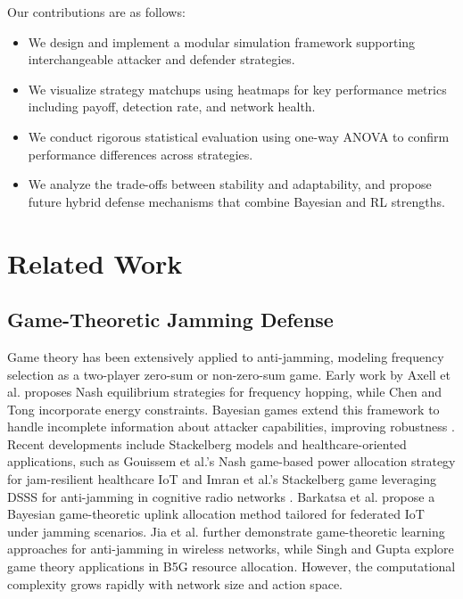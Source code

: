\documentclass[conference]{IEEEtran}
\begin{document}
Our contributions are as follows:
\begin{itemize}
  \item We design and implement a modular simulation framework supporting interchangeable attacker and defender strategies.  
  \item We visualize strategy matchups using heatmaps for key performance metrics including payoff, detection rate, and network health.  
  \item We conduct rigorous statistical evaluation using one-way ANOVA to confirm performance differences across strategies.  
  \item We analyze the trade-offs between stability and adaptability, and propose future hybrid defense mechanisms that combine Bayesian and RL strengths.  
\end{itemize}

\section{Related Work}

\subsection{Game-Theoretic Jamming Defense}
Game theory has been extensively applied to anti-jamming, modeling frequency selection as a two-player zero-sum or non-zero-sum game. Early work by Axell et al. \cite{axell2012detection} proposes Nash equilibrium strategies for frequency hopping, while Chen and Tong \cite{chen2019anti} incorporate energy constraints. Bayesian games extend this framework to handle incomplete information about attacker capabilities, improving robustness \cite{alpcan2007game,khouzani2012evolving}. Recent developments include Stackelberg models and healthcare-oriented applications, such as Gouissem et al.'s Nash game-based power allocation strategy for jam-resilient healthcare IoT \cite{gouissem2022nash} and Imran et al.'s Stackelberg game leveraging DSSS for anti-jamming in cognitive radio networks \cite{imran2024stackelberg}. Barkatsa et al. \cite{barkatsa2024bayesian} propose a Bayesian game-theoretic uplink allocation method tailored for federated IoT under jamming scenarios. Jia et al. \cite{jia2022game} further demonstrate game-theoretic learning approaches for anti-jamming in wireless networks, while Singh and Gupta \cite{resource2023slicing} explore game theory applications in B5G resource allocation. However, the computational complexity grows rapidly with network size and action space.
\end{document}
